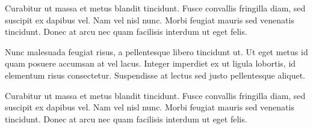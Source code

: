 Curabitur ut massa et metus blandit tincidunt. Fusce convallis fringilla diam, sed suscipit ex dapibus vel. Nam vel nisl nunc. Morbi feugiat mauris sed venenatis tincidunt. Donec at arcu nec quam facilisis interdum ut eget felis.

Nunc malesuada feugiat risus, a pellentesque libero tincidunt ut. Ut eget metus id quam posuere accumsan at vel lacus. Integer imperdiet ex ut ligula lobortis, id elementum risus consectetur. Suspendisse at lectus sed justo pellentesque aliquet.

Curabitur ut massa et metus blandit tincidunt. Fusce convallis fringilla diam, sed suscipit ex dapibus vel. Nam vel nisl nunc. Morbi feugiat mauris sed venenatis tincidunt. Donec at arcu nec quam facilisis interdum ut eget felis.

